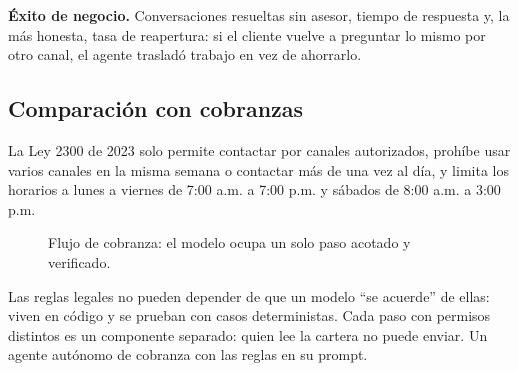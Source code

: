 \textbf{Éxito de negocio.} Conversaciones resueltas sin asesor, tiempo de respuesta y, la más
honesta, tasa de reapertura: si el cliente vuelve a preguntar lo mismo por otro canal, el
agente trasladó trabajo en vez de ahorrarlo.

\subsection*{Comparación con cobranzas}
La Ley 2300 de 2023 \citep{ley2300} solo permite contactar por canales autorizados, prohíbe
usar varios canales en la misma semana o contactar más de una vez al día, y limita los
horarios a lunes a viernes de 7:00 a.m. a 7:00 p.m. y sábados de 8:00 a.m. a 3:00 p.m.

\begin{figure}[!htbp]
  \centering
  
  \caption{Flujo de cobranza: el modelo ocupa un solo paso acotado y verificado.}
  \label{fig:cobranzas}
\end{figure}

{Las reglas legales no pueden depender de que un modelo ``se acuerde'' de ellas: viven en
código y se prueban con casos deterministas. Cada paso con permisos distintos es un componente
separado: quien lee la cartera no puede enviar.}
{Un agente autónomo de cobranza con las reglas en su prompt.}
